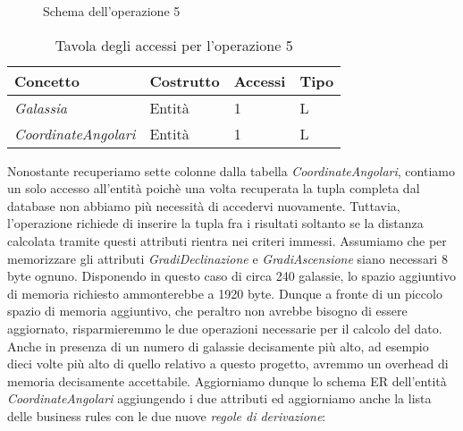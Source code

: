 \documentclass[12pt,a4paper,onecolumn,x11names]{article}
\begin{document}
\begin{figure}[h!]
				\caption{Schema dell'operazione 5}
			\end{figure}			

	\begin{table}[h!]
		\caption{Tavola degli accessi per l'operazione 5}
		\begin{tabular}{llll}
			\hline
			\rowcolor[HTML]{66CC99}Concetto	& Costrutto	&Accessi & Tipo\\ \hline
			\textit{Galassia}				& Entità & 1		& L		\\
			\textit{CoordinateAngolari}		& Entità & 1		& L
		\end{tabular}
	\end{table}
	\begin{flushleft}
		Nonostante recuperiamo sette colonne dalla tabella \textit{CoordinateAngolari}, contiamo un solo accesso all'entità poichè una volta recuperata la tupla completa dal database non abbiamo più necessità di accedervi nuovamente. Tuttavia, l'operazione richiede di inserire la tupla fra i risultati soltanto se la distanza calcolata tramite questi attributi rientra nei criteri immessi.\newline
		Assumiamo che per memorizzare gli attributi \textit{GradiDeclinazione} e \textit{GradiAscensione} siano necessari 8 byte ognuno. Disponendo in questo caso di circa 240 galassie, lo spazio aggiuntivo di memoria richiesto ammonterebbe a 1920 byte. Dunque a fronte di un piccolo spazio di memoria aggiuntivo, che peraltro non avrebbe bisogno di essere aggiornato, risparmieremmo le due operazioni necessarie per il calcolo del dato. Anche in presenza di un numero di galassie decisamente più alto, ad esempio dieci volte più alto di quello relativo a questo progetto, avremmo un overhead di memoria decisamente accettabile.\newline
		Aggiorniamo dunque lo schema ER dell'entità \textit{CoordinateAngolari} aggiungendo i due attributi ed aggiorniamo anche la lista delle business rules con le due nuove \textit{regole di derivazione}:
	\end{flushleft}
\end{document}
